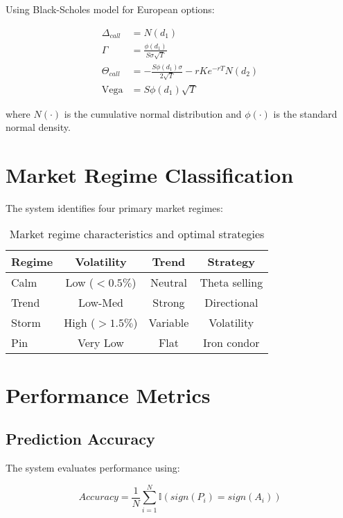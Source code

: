\documentclass[12pt,a4paper]{article}
\begin{document}
Using Black-Scholes model for European options:

\begin{align}
\Delta_{call} &= N(d_1) \\
\Gamma &= \frac{\phi(d_1)}{S\sigma\sqrt{T}} \\
\Theta_{call} &= -\frac{S\phi(d_1)\sigma}{2\sqrt{T}} - rKe^{-rT}N(d_2) \\
\text{Vega} &= S\phi(d_1)\sqrt{T}
\end{align}

where $N(\cdot)$ is the cumulative normal distribution and $\phi(\cdot)$ is the standard normal density.

\section{Market Regime Classification}

The system identifies four primary market regimes:

\begin{table}[H]
\centering
\begin{tabular}{|l|c|c|c|}
\hline
\textbf{Regime} & \textbf{Volatility} & \textbf{Trend} & \textbf{Strategy} \\
\hline
Calm & Low ($<0.5\%$) & Neutral & Theta selling \\
Trend & Low-Med & Strong & Directional \\
Storm & High ($>1.5\%$) & Variable & Volatility \\
Pin & Very Low & Flat & Iron condor \\
\hline
\end{tabular}
\caption{Market regime characteristics and optimal strategies}
\end{table}

\section{Performance Metrics}

\subsection{Prediction Accuracy}

The system evaluates performance using:

\begin{equation}
Accuracy = \frac{1}{N} \sum_{i=1}^{N} \mathbb{I}(sign(P_i) = sign(A_i))
\end{equation}
\end{document}
